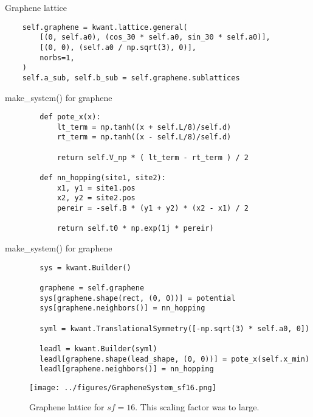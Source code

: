 \documentclass{beamer}
\begin{document}
\begin{frame}[fragile]{Graphene lattice}
	\begin{verbatim}
    self.graphene = kwant.lattice.general(
        [(0, self.a0), (cos_30 * self.a0, sin_30 * self.a0)],
        [(0, 0), (self.a0 / np.sqrt(3), 0)],
        norbs=1,
    )
    self.a_sub, self.b_sub = self.graphene.sublattices
    \end{verbatim}
\end{frame}

\begin{frame}[fragile]{make\_system() for graphene}
	\begin{verbatim}
        def pote_x(x):
            lt_term = np.tanh((x + self.L/8)/self.d)
            rt_term = np.tanh((x - self.L/8)/self.d)

            return self.V_np * ( lt_term - rt_term ) / 2

        def nn_hopping(site1, site2):
            x1, y1 = site1.pos
            x2, y2 = site2.pos
            pereir = -self.B * (y1 + y2) * (x2 - x1) / 2

            return self.t0 * np.exp(1j * pereir)
    \end{verbatim}
\end{frame}

\begin{frame}[fragile]{make\_system() for graphene}
	\begin{verbatim}
        sys = kwant.Builder()

        graphene = self.graphene
        sys[graphene.shape(rect, (0, 0))] = potential
        sys[graphene.neighbors()] = nn_hopping

        syml = kwant.TranslationalSymmetry([-np.sqrt(3) * self.a0, 0])

        leadl = kwant.Builder(syml)
        leadl[graphene.shape(lead_shape, (0, 0))] = pote_x(self.x_min)
        leadl[graphene.neighbors()] = nn_hopping
    \end{verbatim}
\end{frame}

\begin{frame}
	\begin{figure}
		\begin{center}
			\texttt{[image: ../figures/GrapheneSystem\_sf16.png]}
		\end{center}
		\caption{Graphene lattice for $sf = 16$. This scaling factor was to large.}
	\end{figure}
\end{frame}
\end{document}
